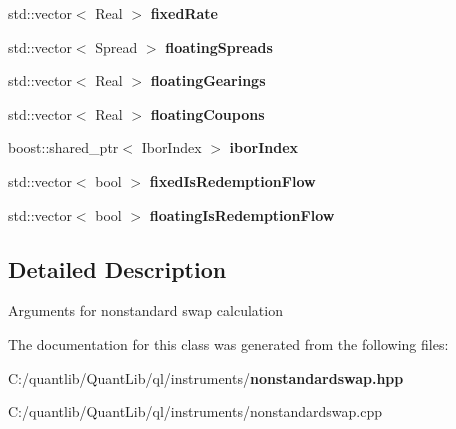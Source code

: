 \begin{DoxyCompactItemize}
\item 
std\+::vector$<$ Real $>$ {\bfseries fixed\+Rate}\label{class_quant_lib_1_1_nonstandard_swap_1_1arguments_a0289cc842d6a76ce7909c0e7bcce666f}

\item 
std\+::vector$<$ Spread $>$ {\bfseries floating\+Spreads}\label{class_quant_lib_1_1_nonstandard_swap_1_1arguments_a147be1b4c917ea7e1baea48f86c9977e}

\item 
std\+::vector$<$ Real $>$ {\bfseries floating\+Gearings}\label{class_quant_lib_1_1_nonstandard_swap_1_1arguments_aaf9b048035ffad2b82993355f3e30373}

\item 
std\+::vector$<$ Real $>$ {\bfseries floating\+Coupons}\label{class_quant_lib_1_1_nonstandard_swap_1_1arguments_a1be576332a1908ec4f8c9388ce90ccad}

\item 
boost\+::shared\+\_\+ptr$<$ Ibor\+Index $>$ {\bfseries ibor\+Index}\label{class_quant_lib_1_1_nonstandard_swap_1_1arguments_a03500e4f34ae052d9f5a08678224bdc3}

\item 
std\+::vector$<$ bool $>$ {\bfseries fixed\+Is\+Redemption\+Flow}\label{class_quant_lib_1_1_nonstandard_swap_1_1arguments_a653dbd0e002b883aa508e555b6d54fac}

\item 
std\+::vector$<$ bool $>$ {\bfseries floating\+Is\+Redemption\+Flow}\label{class_quant_lib_1_1_nonstandard_swap_1_1arguments_a4edbde946f1474f303a4c3eb2657b4c5}

\end{DoxyCompactItemize}


\subsection{Detailed Description}
Arguments for nonstandard swap calculation 

The documentation for this class was generated from the following files\+:\begin{DoxyCompactItemize}
\item 
C\+:/quantlib/\+Quant\+Lib/ql/instruments/{\bf nonstandardswap.\+hpp}\item 
C\+:/quantlib/\+Quant\+Lib/ql/instruments/nonstandardswap.\+cpp\end{DoxyCompactItemize}

